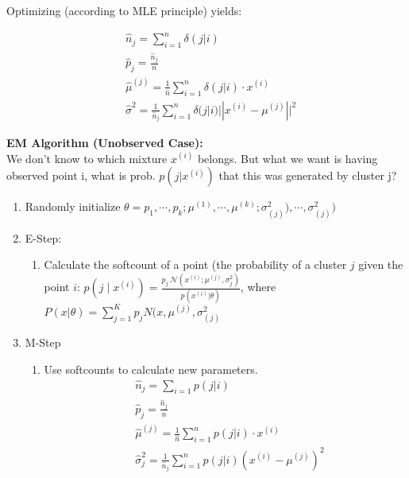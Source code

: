 Optimizing (according to MLE principle) yields:

\begin{align*}
&\hat{n}_j = \sum_{i=1}^n \delta(j|i)\\
&\hat{p}_j = \frac{\hat{n}_j}{n}\\
&\hat{\mu}^{(j)}= \frac{1}{\hat{n}} \sum
_{i=1}^n \delta(j|i) \cdot x^{(i)}\\
&\hat{\sigma}^2 = \frac{1}{\hat{n}_j}\sum_{i=1}^n \delta(j|i) || x^{(i)} - \mu^{(j)}||^2
\end{align*}

\textbf{EM Algorithm (Unobserved Case):}\\
We don't know to which mixture $x^{(i)}$ belongs. But what we want is  
having observed point i, what is prob. $p(j|x^{(i)})$ that this was generated by cluster j?


\begin{enumerate}
\item Randomly initialize $\theta={p_1,\cdots,p_k;\mu^{(1)},\cdots,\mu^{(k)};\sigma^2_{(j)}),\cdots,\sigma^2_{(j)})}$
\item E-Step:
	\begin{enumerate}
		\item Calculate the softcount of a point (the probability of a cluster $j$ given the point $i$: $\displaystyle  p(j \mid x^{(i)}) = \frac{p_ j ~  \mathcal{N}(x^{(i)} ; \mu ^{(j)}, \sigma _ j^2)}{p(x^{(i)} | \theta )}$, where $P(x|\theta)=\sum_{j=1}^K p_j N(x,\mu^{(j)},\sigma^2_{(j)}$
	\end{enumerate}
\item M-Step
	\begin{enumerate}
		\item  Use softcounts to calculate new parameters.
		\begin{align*}
		&\hat{n}_j = \sum_{i=1} p(j|i)\\
		&\hat{p}_j= \frac{\hat{n}_j}{n}\\
		&\hat{\mu}^{(j)}= \frac{1}{\hat{n}} \sum
_{i=1}^n p(j|i) \cdot x^{(i)}\\
		&\hat{\sigma}^2_j=\frac{1}{\hat{n}_j}\sum_{i=1}^n p(j|i) (x^{(i)} - \mu^{(j)})^2
		\end{align*}
	\end{enumerate}
\end{enumerate}